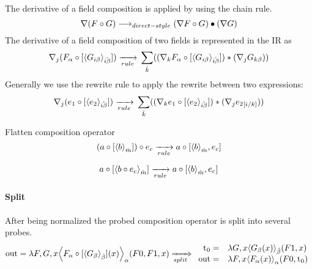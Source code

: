 The derivative of a field composition is applied by using the chain rule.\\
$$\nabla (F \circ G) \rowSurface (\nabla F \circ G)\bullet (\nabla G) $$
The derivative of a field composition of two fields is represented in the \name{} IR as 
$$\nabla_j (\expComp{F_\alpha}{G_{i\beta}}{i\beta}) \rewriteRule{}
\sum_{\hat{k}}( (\expComp{\nabla_k  F_\alpha}{G_{i\beta}}{i\beta}) * (\nabla_j G_{k\beta}) )$$
Generally we use the rewrite rule to apply the rewrite between two \name{} expressions:\\
$$\nabla_j (\expComp{e_1}{e_2}{i\beta}) \rewriteRule{}
\sum_{\hat{k}}( (\expComp{\nabla_k  e_1}{e_2}{i\beta}) * (\nabla_j \expIndex{e_2}{i}{k}) )$$


Flatten composition operator
$$ \expCompSingle{ (\expComp{a}{b}{m})}{c}{n} 
\rewriteRule{}
\expCompList{a}{b}{m}
$$

$$ \expComp{a}{\expCompSingle{b}{c}{n}}{m} 
\rewriteRule{}
\expCompList{a}{b}{m}
$$



\paragraph{Split}
After being normalized the probed composition operator is split into several probes.
$$
\text{\lstinline!out!} = \lambda F,G,x \EinExp{\expComp{F_\alpha}{G_\beta}{\beta}(x)}{\alpha}(F0, F1, x)
\rewriteSplit{}
\begin{array}{rl}
\lstinline!t!_0 = & \lambda G,x\EinExp{G_\beta(x)}{\hat{\beta}}(F1,x)\\
\text{\lstinline!out!}= & \lambda F,x \EinExp{F_\alpha(x)}{\alpha}(F0, \lstinline!t!_0)
 \end{array}$$
 